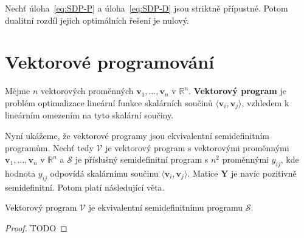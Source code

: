 \begin{vt}
    Nechť úloha~\ref{eq:SDP-P} a úloha~\ref{eq:SDP-D} jsou striktně přípustné. Potom dualitní rozdíl jejich optimálních řešení je nulový.
\end{vt}


\section{Vektorové programování}

Mějme $n$ vektorových proměnných $\mathbf{v}_1, \dots, \mathbf{v}_n$ v $\mathbb{R}^n$. \textbf{Vektorový program} je problém optimalizace lineární funkce skalárních součinů $\langle \mathbf{v}_i, \mathbf{v}_j \rangle$, vzhledem k lineárním omezením na tyto skalární součiny.

Nyní ukážeme, že vektorové programy jsou ekvivalentní semidefinitním programům. Nechť tedy $\mathcal{V}$ je vektorový program s vektorovými proměnnými $\mathbf{v}_1, \dots, \mathbf{v}_n$ v $\mathbb{R}^n$ a $\mathcal{S}$ je příslušný semidefinitní program s $n^2$ proměnnými $y_{ij}$, kde hodnota $y_{ij}$ odpovídá skalárnímu součinu $\langle \mathbf{v}_i, \mathbf{v}_j \rangle$. Matice $\mathbf{Y}$ je navíc pozitivně semidefinitní. Potom platí následující věta.

\begin{vt}
    Vektorový program $\mathcal{V}$ je ekvivalentní semidefinitnímu programu $\mathcal{S}$.
\end{vt}

\begin{proof}
    TODO
\end{proof}


% 
% 
% 
% 
% 
% 
% 


